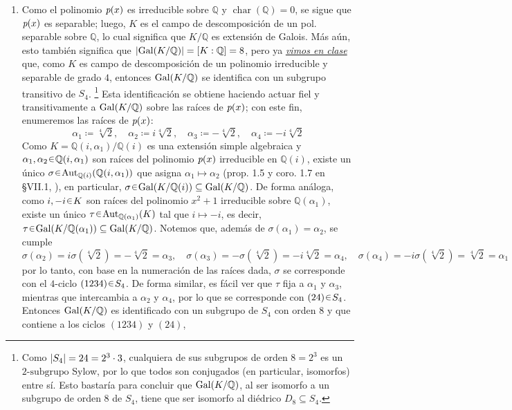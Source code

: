 \begin{sol}
\begin{enumerate}[label=\alph*)]
\item 
Como el polinomio $\operatorname{\textit{p}}(x)$ es irreducible sobre $\mathbb{Q}$ y $\operatorname{char}(\mathbb{Q}) = 0$, se sigue que $\operatorname{\textit{p}}(x)$ es separable; luego, $K$ es el campo de descomposición de un pol. separable sobre $\mathbb{Q}$, lo cual significa que $K/\mathbb{Q}$ es extensión de Galois. Más aún, esto también significa que $\abs{\operatorname{Gal}(K/\mathbb{Q})} = [K:\mathbb{Q}] = 8$, pero ya \href{https://drive.google.com/file/d/11XpEmoZvQKK8-aPO5kTbNUl5Omyh1Ppl/view?usp=drive_link}{\emph{vimos en clase}} que, como $K$ es campo de descomposición de un polinomio irreducible y separable de grado $4$, entonces $\operatorname{Gal}(K/\mathbb{Q})$ se identifica con un subgrupo transitivo de $S_4$.%
\footnote{
    Como $\abs{S_4} = 24 = 2^3\cdot 3$, cualquiera de sus subgrupos de orden $8=2^3$ es un $2\text{-subgrupo}$ Sylow, por lo que todos son conjugados (en particular, isomorfos) entre sí. Esto bastaría para concluir que $\operatorname{Gal}(K/\mathbb{Q})$, al ser isomorfo a un subgrupo de orden $8$ de $S_4$, tiene que ser isomorfo al diédrico $D_8 \subseteq S_4$.
}
Esta identificación se obtiene haciendo actuar fiel y transitivamente a $\operatorname{Gal}(K/\mathbb{Q})$ sobre las raíces de $\operatorname{\textit{p}}(x)$; con este fin, enumeremos las raíces de $\operatorname{\textit{p}}(x)$: 
\[
\alpha_1 \coloneq \sqrt[4]{2},%
\quad
\alpha_2 \coloneq i\sqrt[4]{2},%
\quad
\alpha_3 \coloneq -\sqrt[4]{2},%
\quad
\alpha_4 \coloneq -i\sqrt[4]{2}
\]
Como $K = \mathbb{Q}(i,\alpha_1)/\mathbb{Q}(i)$ es una extensión simple algebraica y $\alpha_1,\alpha_2\en\mathbb{Q}(i,\alpha_1)$ son raíces del polinomio $\operatorname{\textit{p}}(x)$ irreducible en $\mathbb{Q}(i)$, existe un único $\sigma \en \aut_{\mathbb{Q}(i)}(\mathbb{Q}(i,\alpha_1))$ que asigna $\alpha_1 \mapsto \alpha_2$ (prop. 1.5 y coro. 1.7 en \S VII.1, \cite{aluffi}), en particular, $\sigma \en \gal(K/\mathbb{Q}(i)) \subseteq \gal(K/\mathbb{Q})$. De forma análoga, como $i,-i\en K$ son raíces del polinomio $x^2+1$ irreducible sobre $\mathbb{Q}(\alpha_1)$, existe un único $\tau\en \aut_{\mathbb{Q}(\alpha_1)}(K)$ tal que $i \mapsto -i$, es decir, $\tau \en \gal(K/\mathbb{Q}(\alpha_1)) \subseteq \gal(K/\mathbb{Q})$. Notemos que, además de $\sigma(\alpha_1) = \alpha_2$, se cumple 
\[
\sigma(\alpha_2) = i\sigma(\sqrt[4]{2}) = -\sqrt[4]{2} = \alpha_3,%
\quad
\sigma(\alpha_3) = -\sigma(\sqrt[4]{2}) = -i\sqrt[4]{2} = \alpha_4,%
\quad
\sigma(\alpha_4) = -i\sigma(\sqrt[4]{2}) = \sqrt[4]{2} = \alpha_1
\]
por lo tanto, con base en la numeración de las raíces dada, $\sigma$ se corresponde con el $4\text{-ciclo}$ $(1234) \en S_4$. De forma similar, es fácil ver que $\tau$ fija a $\alpha_1$ y $\alpha_3$, mientras que intercambia a $\alpha_2$ y $\alpha_4$, por lo que se corresponde con $(24)\en S_4$. Entonces $\operatorname{Gal}(K/\mathbb{Q})$ es identificado con un subgrupo de $S_4$ con orden $8$ y que contiene a los ciclos $(1234)$ y $(24)$,%

\end{enumerate}
\end{sol}

